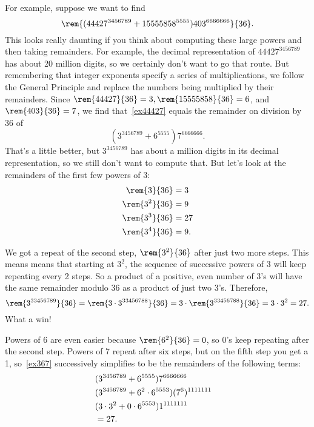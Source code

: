 For example, suppose we want to find
\begin{equation}\label{ex44427}
\rem{(44427^{3456789} + 15555858^{5555})403^{6666666}}{36}.
\end{equation}
This looks really daunting if you think about computing these large
powers and then taking remainders.  For example, the decimal
representation of $44427^{3456789}$ has about 20 million digits, so we
certainly don't want to go that route.  But remembering that integer
exponents specify a series of multiplications, we follow the General
Principle and replace the numbers being multiplied by their
remainders.  Since $\rem{44427}{36} = 3, \rem{15555858}{36} = 6$, and
$\rem{403}{36} = 7$, we find that~\eqref{ex44427} equals the remainder
on division by 36 of
\begin{equation}\label{ex367}
(3^{3456789} + 6^{5555})7^{6666666}.
\end{equation}
That's a little better, but $3^{3456789}$ has about a million digits
in its decimal representation, so we still don't want to compute that.
But let's look at the remainders of the first few powers of 3:
\begin{align*}
\rem{3}{36} & = 3\\
\rem{3^2}{36} & = 9\\
\rem{3^3}{36} & = 27\\
\rem{3^4}{36} & = 9.
\end{align*}

We got a repeat of the second step, $\rem{3^2}{36}$ after just two
more steps.  This means means that starting at $3^2$, the sequence of
successive powers of 3 will keep repeating every 2 steps.  So a
product of a positive, even number of 3's will have the same remainder
modulo 36 as a product of just two 3's.  Therefore,
\[
\rem{3^{33456789}}{36} = \rem{3 \cdot 3^{33456788}}{36}
                     = 3 \cdot \rem{3^{33456788}}{36}
                     = 3 \cdot 3^2 = 27.
\]
What a win!

Powers of 6 are even easier because $\rem{6^2}{36} = 0$, so 0's keep
repeating after the second step.  Powers of 7 repeat after six steps,
but on the fifth step you get a 1, so~\eqref{ex367} successively
simplifies to be the remainders of the following terms:
\begin{align*}
\lefteqn{(3^{3456789} + 6^{5555})7^{6666666}}\\
   & (3^{3456789} + 6^2 \cdot 6^{5553})(7^6)^{1111111}\\
   & (3\cdot 3^2 + 0 \cdot 6^{5553})1^{1111111}\\
   & = 27.
\end{align*}

